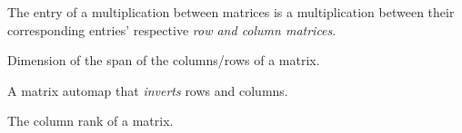 \begin{multicols}{3}
  The entry of a multiplication between matrices is a multiplication between
  their corresponding entries' respective \textit{row and column matrices}.




  Dimension of the span of the columns/rows of a matrix.

  A matrix automap that \textit{inverts} rows and columns.



  The column rank of a matrix.
  

\end{multicols}


